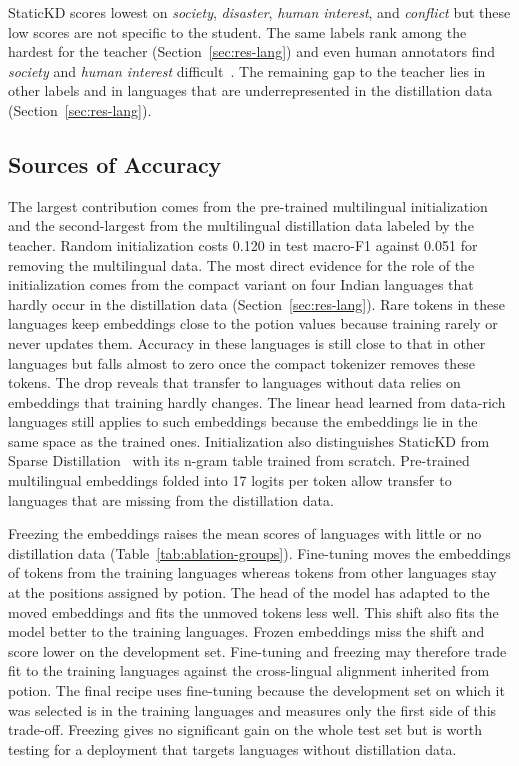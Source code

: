 \documentclass{ieeeaccess}
\begin{document}
StaticKD scores lowest on \emph{society}, \emph{disaster}, \emph{human interest}, and \emph{conflict} but these low scores are not specific to the student. The same labels rank among the hardest for the teacher (Section~\ref{sec:res-lang}) and even human annotators find \emph{society} and \emph{human interest} difficult~\cite{kuzman2025llm}. The remaining gap to the teacher lies in other labels and in languages that are underrepresented in the distillation data (Section~\ref{sec:res-lang}).

\subsection{Sources of Accuracy}
The largest contribution comes from the pre-trained multilingual initialization and the second-largest from the multilingual distillation data labeled by the teacher. Random initialization costs 0.120 in test macro-F1 against 0.051 for removing the multilingual data. The most direct evidence for the role of the initialization comes from the compact variant on four Indian languages that hardly occur in the distillation data (Section~\ref{sec:res-lang}). Rare tokens in these languages keep embeddings close to the potion values because training rarely or never updates them. Accuracy in these languages is still close to that in other languages but falls almost to zero once the compact tokenizer removes these tokens. The drop reveals that transfer to languages without data relies on embeddings that training hardly changes. The linear head learned from data-rich languages still applies to such embeddings because the embeddings lie in the same space as the trained ones. Initialization also distinguishes StaticKD from Sparse Distillation~\cite{ye2022sparse} with its n-gram table trained from scratch. Pre-trained multilingual embeddings folded into 17 logits per token allow transfer to languages that are missing from the distillation data.

Freezing the embeddings raises the mean scores of languages with little or no distillation data (Table~\ref{tab:ablation-groups}). Fine-tuning moves the embeddings of tokens from the training languages whereas tokens from other languages stay at the positions assigned by potion. The head of the model has adapted to the moved embeddings and fits the unmoved tokens less well. This shift also fits the model better to the training languages. Frozen embeddings miss the shift and score lower on the development set. Fine-tuning and freezing may therefore trade fit to the training languages against the cross-lingual alignment inherited from potion. The final recipe uses fine-tuning because the development set on which it was selected is in the training languages and measures only the first side of this trade-off. Freezing gives no significant gain on the whole test set but is worth testing for a deployment that targets languages without distillation data.
\end{document}
